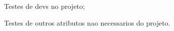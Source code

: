 
\begin{DoxyItemize}
\item Testes de devs no projeto;
\item Testes de outros atributos nao necessarios do projeto. 
\end{DoxyItemize}